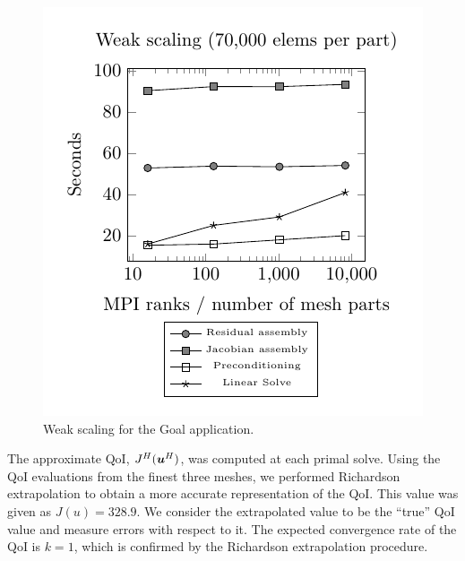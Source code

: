 \begin{figure}[ht!]
\centering
\includegraphics[width=0.75\linewidth]{img/aut_weak_scaling.pdf}
\caption{Weak scaling for the Goal application.}
\label{fig:aut_weak_scaling}
\end{figure}

The approximate QoI, $J^H(\boldsymbol{u}^H)$, was computed at each
primal solve. Using the QoI evaluations from the finest three meshes,
we performed Richardson extrapolation \cite{richardson1911approximate}
to obtain a more accurate representation of the QoI.
This value was given as $J(u) = 328.9$. We consider the extrapolated
value to be the ``true'' QoI value and measure errors with respect
to it. The expected convergence rate of the QoI is $k=1$, which is
confirmed by the Richardson extrapolation procedure.

